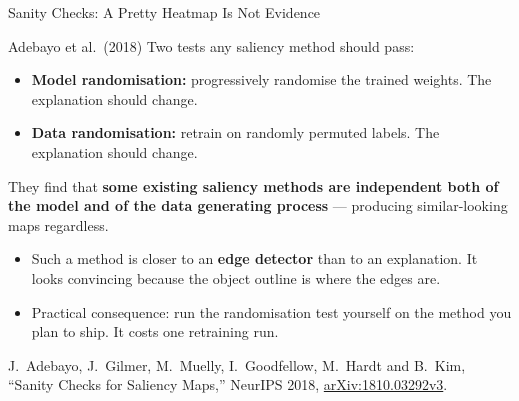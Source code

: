 \begin{frame}{Sanity Checks: A Pretty Heatmap Is Not Evidence}

    \begin{block}{Adebayo et al.\ (2018)}
        Two tests any saliency method should pass:
        \begin{itemize}
            \item \textbf{Model randomisation:} progressively randomise the trained weights. The
                  explanation should change.
            \item \textbf{Data randomisation:} retrain on randomly permuted labels. The explanation
                  should change.
        \end{itemize}
        They find that \textbf{some existing saliency methods are independent both of the model and
        of the data generating process} --- producing similar-looking maps regardless.
    \end{block}

    \vspace{0.8em}

    \begin{itemize}
        \setlength\itemsep{0.4em}
        \item Such a method is closer to an \textbf{edge detector} than to an explanation. It looks
              convincing because the object outline is where the edges are.
        \item Practical consequence: run the randomisation test yourself on the method you plan to
              ship. It costs one retraining run.
    \end{itemize}

    \vspace{0.3em}
    {\scriptsize J.~Adebayo, J.~Gilmer, M.~Muelly, I.~Goodfellow, M.~Hardt and B.~Kim, ``Sanity
    Checks for Saliency Maps,'' NeurIPS 2018,
    \href{https://arxiv.org/abs/1810.03292v3}{arXiv:1810.03292v3}.}
\end{frame}

